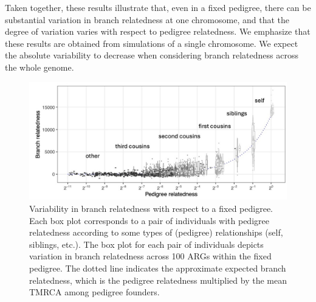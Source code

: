 Taken together, these results illustrate that, even in a fixed pedigree,
there can be substantial variation in branch relatedness at one chromosome,
and that the degree of variation varies with respect to pedigree relatedness.
%
We emphasize that these results are obtained from simulations of a single chromosome.
%
We expect the absolute variability to decrease when considering
branch relatedness across the whole genome.

\begin{figure}
    \centering
    \includegraphics[width=\textwidth]{Figures/Fig5_branch_recap_sim_boxplot_combined_behind2.jpg}
    \caption{Variability in branch relatedness with respect to a fixed pedigree.
    Each box plot corresponds to a pair of individuals with pedigree relatedness
    according to some types of (pedigree) relationships (self, siblings, etc.).
    The box plot for each pair of individuals depicts variation in branch relatedness across 100 ARGs within the fixed pedigree.
    The dotted line indicates the approximate expected branch relatedness,
    which is the pedigree relatedness multiplied by the mean TMRCA among pedigree founders.}
    \label{fig:boxplots}
\end{figure}



% 


